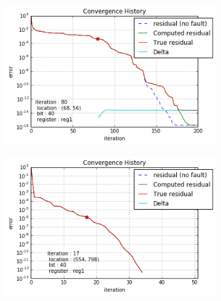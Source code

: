 \begin{figure}[h]
\begin{minipage}[b]{0.48\linewidth}
\begin{subfigure}[t]{\linewidth}
		\includegraphics[width=\linewidth]{figures/gre_216a/convergence_history_location_2.png}
		\caption{}\label{fig:gre_216a_conv_hist_location_2}
	\end{subfigure}
    \end{minipage}
    \quad
    \begin{minipage}[b]{0.48\linewidth}
    	\begin{subfigure}[t]{\linewidth}
		\centering
		\includegraphics[width=\linewidth]{figures/pores_2/convergence_history_location_0.png}
		\caption{}\label{fig:pores_2_conv_hist_location_0}		
	\end{subfigure}
	\quad
	\begin{subfigure}[t]{\linewidth}
		\centering

\end{subfigure}
\end{minipage}
\end{figure}
